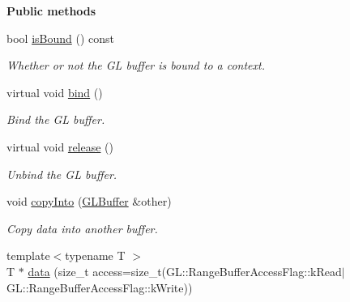 \begin{Indent}\textbf{ Public methods}\par
\begin{DoxyCompactItemize}
\item 
\mbox{\label{classrev_1_1_g_l_buffer_a7b0839ae8a7e8c4d6953741aa107fc85}} 
bool \mbox{\hyperlink{classrev_1_1_g_l_buffer_a7b0839ae8a7e8c4d6953741aa107fc85}{is\+Bound}} () const
\begin{DoxyCompactList}\small\item\em Whether or not the GL buffer is bound to a context. \end{DoxyCompactList}\item 
\mbox{\label{classrev_1_1_g_l_buffer_afe409ba5cffda40f65f3b5073e5cdeac}} 
virtual void \mbox{\hyperlink{classrev_1_1_g_l_buffer_afe409ba5cffda40f65f3b5073e5cdeac}{bind}} ()
\begin{DoxyCompactList}\small\item\em Bind the GL buffer. \end{DoxyCompactList}\item 
\mbox{\label{classrev_1_1_g_l_buffer_a66dc6c1dbeec152eb01856867debb825}} 
virtual void \mbox{\hyperlink{classrev_1_1_g_l_buffer_a66dc6c1dbeec152eb01856867debb825}{release}} ()
\begin{DoxyCompactList}\small\item\em Unbind the GL buffer. \end{DoxyCompactList}\item 
\mbox{\label{classrev_1_1_g_l_buffer_a0217c15947f9165dcce26525b874bdf0}} 
void \mbox{\hyperlink{classrev_1_1_g_l_buffer_a0217c15947f9165dcce26525b874bdf0}{copy\+Into}} (\mbox{\hyperlink{classrev_1_1_g_l_buffer}{G\+L\+Buffer}} \&other)
\begin{DoxyCompactList}\small\item\em Copy data into another buffer. \end{DoxyCompactList}\item 
\mbox{\label{classrev_1_1_g_l_buffer_a4689f1b226bde386a92a11388c083f3a}} 
{\footnotesize template$<$typename T $>$ }\\T $\ast$ \mbox{\hyperlink{classrev_1_1_g_l_buffer_a4689f1b226bde386a92a11388c083f3a}{data}} (size\+\_\+t access=size\+\_\+t(G\+L\+::\+Range\+Buffer\+Access\+Flag\+::k\+Read$\vert$G\+L\+::\+Range\+Buffer\+Access\+Flag\+::k\+Write))

\end{DoxyCompactItemize}
\end{Indent}
